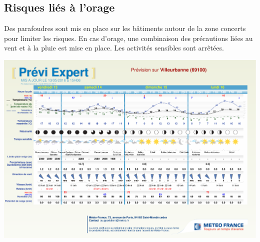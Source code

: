 \documentclass[hidelinks, paper=a4, fontsize=13pt]{report}
\begin{document}
\subsection{Risques liés à l’orage}

Des parafoudres sont mis en place sur les bâtiments autour de la zone concerts pour limiter les risques. En cas d’orage, une combinaison des précautions liées au vent et à la pluie est mise en place. Les activités sensibles sont arrêtées. 

\begin{center}
	\includegraphics[scale=0.45, angle=90]{Annexes/Documents/BulletinMeteo}
	\label{refMeteo}
\end{center}
\end{document}

